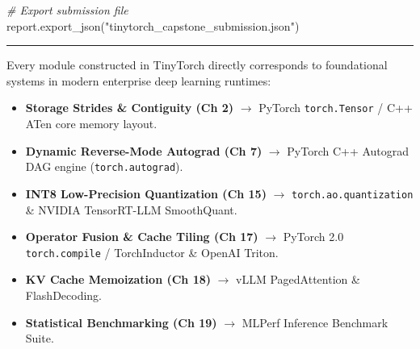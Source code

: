 \documentclass[
  letterpaper,
]{scrbook}
\newenvironment{Shaded}{\begin{snugshade}}{\end{snugshade}}
\newcommand{\CommentTok}[1]{\textcolor[rgb]{0.56,0.35,0.01}{\textit{#1}}}
\newcommand{\NormalTok}[1]{#1}
\newcommand{\StringTok}[1]{\textcolor[rgb]{0.31,0.60,0.02}{#1}}
\providecommand{\tightlist}{%
  \setlength{\itemsep}{0pt}\setlength{\parskip}{0pt}}
\begin{document}
\begin{Shaded}
\begin{Highlighting}[]
\CommentTok{\# Export submission file}
\NormalTok{report.export\_json(}\StringTok{"tinytorch\_capstone\_submission.json"}\NormalTok{)}
\end{Highlighting}
\end{Shaded}

\begin{center}\rule{0.5\linewidth}{0.5pt}\end{center}

\begin{tcolorbox}[enhanced jigsaw, arc=.35mm, bottomrule=.15mm, bottomtitle=1mm, breakable, colback=white, colbacktitle=quarto-callout-note-color!10!white, colframe=quarto-callout-note-color-frame, coltitle=black, left=2mm, leftrule=.75mm, opacityback=0, opacitybacktitle=0.6, rightrule=.15mm, title=\textcolor{quarto-callout-note-color}{\faInfo}\hspace{0.5em}{PyTorch Systems Bridge: From TinyTorch to Enterprise AI Infrastructure}, titlerule=0mm, toprule=.15mm, toptitle=1mm]

Every module constructed in TinyTorch directly corresponds to
foundational systems in modern enterprise deep learning runtimes:

\begin{itemize}
\tightlist
\item
  \textbf{Storage Strides \& Contiguity (Ch 2)} \(\longrightarrow\)
  PyTorch \texttt{torch.Tensor} / C++ ATen core memory layout.
\item
  \textbf{Dynamic Reverse-Mode Autograd (Ch 7)} \(\longrightarrow\)
  PyTorch C++ Autograd DAG engine (\texttt{torch.autograd}).
\item
  \textbf{INT8 Low-Precision Quantization (Ch 15)} \(\longrightarrow\)
  \texttt{torch.ao.quantization} \& NVIDIA TensorRT-LLM SmoothQuant.
\item
  \textbf{Operator Fusion \& Cache Tiling (Ch 17)} \(\longrightarrow\)
  PyTorch 2.0 \texttt{torch.compile} / TorchInductor \& OpenAI Triton.
\item
  \textbf{KV Cache Memoization (Ch 18)} \(\longrightarrow\) vLLM
  PagedAttention \& FlashDecoding.
\item
  \textbf{Statistical Benchmarking (Ch 19)} \(\longrightarrow\) MLPerf
  Inference Benchmark Suite.\footnotemark{}
\end{itemize}

\end{tcolorbox}

\end{document}

